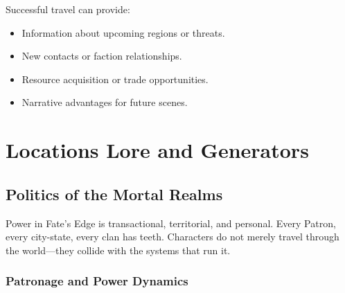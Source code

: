 Successful travel can provide:
\begin{itemize}
    \item Information about upcoming regions or threats.
    \item New contacts or faction relationships.
    \item Resource acquisition or trade opportunities.
    \item Narrative advantages for future scenes.
\end{itemize}

\clearpage
\section{Locations Lore and Generators}

\clearpage

\clearpage

\clearpage

\clearpage

\clearpage

\clearpage

\clearpage

\clearpage

\clearpage

\clearpage

\clearpage

\clearpage

\clearpage

\clearpage

\clearpage

\clearpage

\clearpage

\clearpage

\clearpage

\clearpage

\clearpage

\clearpage

\subsection{Politics of the Mortal Realms}\label{subsec:politics_mortal_realms}

Power in Fate's Edge is transactional, territorial, and personal. Every Patron, every city-state, every clan has teeth. Characters do not merely travel through the world---they collide with the systems that run it.

\subsubsection{Patronage and Power Dynamics}

